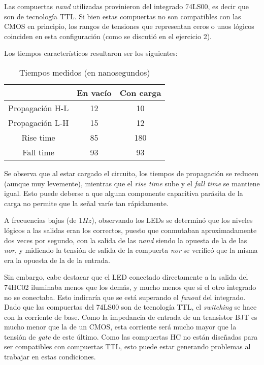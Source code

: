 \documentclass[../../e3_tp2_main.tex]{subfiles}
\begin{document}
Las compuertas \textit{nand} utilizadas provinieron del integrado 74LS00, es decir que son de tecnolog\'ia TTL. Si bien estas compuertas no son compatibles con las CMOS en principio, los rangos de tensiones que representan ceros o unos l\'ogicos coinciden en esta configuraci\'on (como se discuti\'o en el ejercicio 2). \par

Los tiempos caracter\'isticos resultaron ser los siguientes:

\begin{table}[H]
	\centering
	\begin{tabular}{|c|c|c|}
	\hline
                  			& En vac\'io	& Con carga	\\ \hline \hline
	Propagaci\'on H-L	& 12   		& 10            	\\ \hline
	Propagaci\'on L-H 	& 15    		& 12           	\\ \hline
	Rise time         		& 85        		& 180                \\ \hline
	Fall time         		& 93        		& 93               	\\ \hline
	\end{tabular}
	\caption{Tiempos medidos (en nanosegundos)}
	\label{fig:2-circuito}
\end{table}

Se observa que al estar cargado el circuito, los tiempos de propagaci\'on se reducen (aunque muy levemente), mientras que el \textit{rise time} sube y el \textit{fall time} se mantiene igual. Esto puede deberse a que alguna componente capacitiva par\'asita de la carga no permite que la se\~nal var\'ie tan r\'apidamente. \par 

A frecuencias bajas (de 1$Hz$), observando los LEDs se determin\'o que los niveles l\'ogicos a las salidas eran los correctos, puesto que conmutaban aproximadamente dos veces por segundo, con la salida de las \textit{nand} siendo la opuesta de la de las \textit{nor}, y midiendo la tensi\'on de salida de la compuerta \textit{nor} se verific\'o que la misma era la opuesta de la de la entrada.\par

Sin embargo, cabe destacar que el LED conectado directamente a la salida del 74HC02 iluminaba menos que los dem\'as, y mucho menos que si el otro integrado no se conectaba. Esto indicar\'ia que se est\'a superando el \textit{fanout} del integrado. Dado que las compuertas del 74LS00 son de tecnolog\'ia TTL, el \textit{switching} se hace con la corriente de base. Como la impedancia de entrada de un transistor BJT es mucho menor que la de un CMOS, esta corriente ser\'a mucho mayor que la tensi\'on de \textit{gate} de este \'ultimo. Como las compuertas HC no est\'an dise\~nadas para ser compatibles con compuertas TTL, esto puede estar generando problemas al trabajar en estas condiciones.\par
\end{document}
